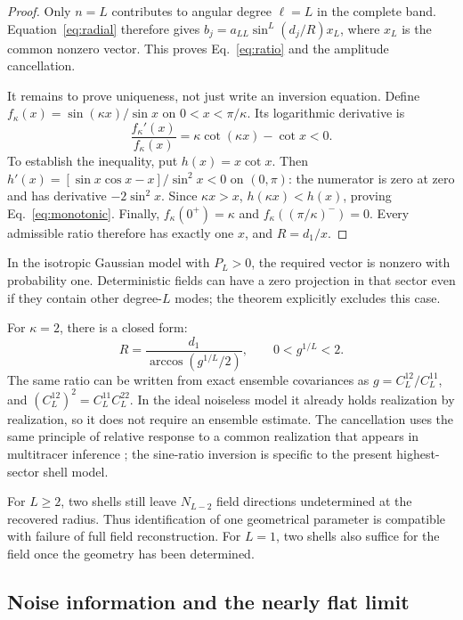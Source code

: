 \documentclass[aps,prd,reprint,amsmath,amssymb,nofootinbib,
longbibliography]{revtex4-2}
\begin{document}
\begin{proof}
Only $n=L$ contributes to angular degree $\ell=L$ in the complete band.
Equation~\eqref{eq:radial} therefore gives
$b_j=a_{LL}\sin^L(d_j/R)x_L$, where $x_L$ is the common nonzero vector.
This proves Eq.~\eqref{eq:ratio} and the amplitude cancellation.

It remains to prove uniqueness, not just write an inversion equation.
Define $f_\kappa(x)=\sin(\kappa x)/\sin x$ on $0<x<\pi/\kappa$.
Its logarithmic derivative is
\begin{equation}
 \frac{f_\kappa'(x)}{f_\kappa(x)}
 =\kappa\cot(\kappa x)-\cot x<0.
 \label{eq:monotonic}
\end{equation}
To establish the inequality, put $h(x)=x\cot x$.
Then $h'(x)=[\sin x\cos x-x]/\sin^2x<0$ on $(0,\pi)$:
the numerator is zero at zero and has derivative $-2\sin^2x$.
Since $\kappa x>x$, $h(\kappa x)<h(x)$, proving
Eq.~\eqref{eq:monotonic}. Finally,
$f_\kappa(0^+)=\kappa$ and $f_\kappa((\pi/\kappa)^-)=0$.
Every admissible ratio therefore has exactly one $x$, and $R=d_1/x$.
\end{proof}

In the isotropic Gaussian model with $P_L>0$, the required vector is
nonzero with probability one. Deterministic fields can have a zero
projection in that sector even if they contain other degree-$L$ modes;
the theorem explicitly excludes this case.

For $\kappa=2$, there is a closed form:
\begin{equation}
 \boxed{R=\frac{d_1}{\arccos\left(g^{1/L}/2\right)}},
 \qquad 0<g^{1/L}<2.
 \label{eq:closedform}
\end{equation}
The same ratio can be written from exact ensemble covariances as
$g=C_L^{12}/C_L^{11}$, and
$(C_L^{12})^2=C_L^{11}C_L^{22}$. In the ideal noiseless model it already
holds realization by realization, so it does not require an ensemble
estimate. The cancellation uses the same principle of relative response
to a common realization that appears in multitracer inference
\cite{Abramo}; the sine-ratio inversion is specific to the present
highest-sector shell model.

For $L\geq2$, two shells still leave $N_{L-2}$ field directions
undetermined at the recovered radius. Thus identification of one
geometrical parameter is compatible with failure of full field
reconstruction. For $L=1$, two shells also suffice for the field once
the geometry has been determined.

\subsection{Noise information and the nearly flat limit}
\end{document}
